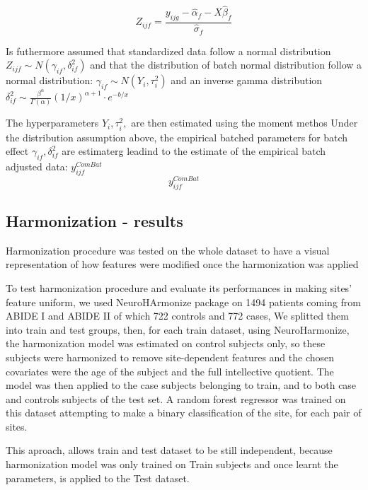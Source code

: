 \documentclass[a4paper,11pt]{article}
\begin{document}
\begin{equation}\label{eq:harmonization_std_data}
Z_{ijf} = \frac{y_{ijg}-\hat \alpha_f - X \hat \beta_f}{\hat \sigma_f}
\end{equation}

Is futhermore assumed that standardized data follow a normal distribution $Z_{ijf} \sim N(\gamma_{if}, \delta^2_{if}) $ and that the distribution
of batch normal distribution follow a normal distribution: $\gamma_{if} \sim N(Y_i, \tau^2_i)$ and an inverse gamma distribution
$\delta^2_{if} \sim \frac{\beta^{\alpha}}{\Gamma (\alpha)}(1/x)^{\alpha +1}\cdot e^{-b/x}$

The hyperparameters $Y_i,  \tau^2_i, $ are then estimated using the moment methos
Under the distribution assumption above, the empirical batched parameters for batch effect $\gamma_{if}, \delta^2_{if}$ are estimaterg leadind to the estimate of the empirical batch adjusted data: $y_{ijf}^{ComBat}$
\begin{equation}
y^{ComBat}_{ijf}
\end{equation}

\subsection{Harmonization - results}


Harmonization procedure was tested on the whole dataset to have a visual representation of how features were modified once the harmonization was applied

To test harmonization procedure and evaluate its performances in making sites' feature uniform, we used NeuroHArmonize package on 1494 patients coming from ABIDE I and ABIDE II of which 722 controls and 772 cases,
We splitted them into train and test groups, then, for each train dataset, using NeuroHarmonize, the harmonization model was estimated on control subjects only, so these subjects were harmonized to remove site-dependent features and the chosen covariates were the age of the subject and the full intellective quotient. The model was then applied to the case subjects belonging to train, and to both case and controls subjects of the test set.
A random forest regressor was trained on this dataset attempting to make a binary classification of the site, for each pair of sites.

This aproach, allows train and test dataset to be still independent, because harmonization model was only trained on Train subjects and once learnt the parameters, is applied to the Test dataset.
\end{document}
